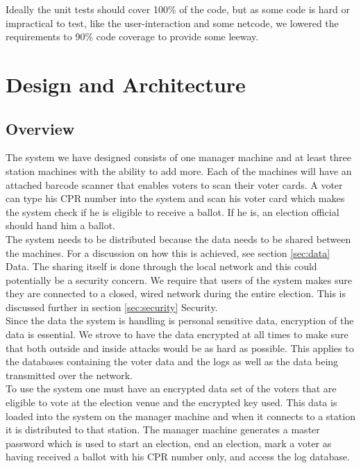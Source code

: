 \documentclass[a4paper]{report}
\begin{document}
Ideally the unit tests should cover 100\% of the code, but as some code is hard or impractical to test, like the user-interaction and some netcode, we lowered the requirements to 90\% code coverage to provide some leeway. 

\chapter{Design and Architecture}
\section{Overview}
The system we have designed consists of one manager machine and at least three station machines with the ability to add more. Each of the machines will have an attached barcode scanner that enables voters to scan their voter cards. A voter can type his CPR number into the system and scan his voter card which makes the system check if he is eligible to receive a ballot. If he is, an election official should hand him a ballot. \\

The system needs to be distributed because the data needs to be shared between the machines. For a discussion on how this is achieved, see section \ref{sec:data} Data. The sharing itself is done through the local network and this could potentially be a security concern. We require that users of the system makes sure they are connected to a closed, wired network during the entire election. This is discussed further in section \ref{sec:security} Security.\\

Since the data the system is handling is personal sensitive data, encryption of the data is essential. We strove to have the data encrypted at all times to make sure that both outside and inside attacks would be as hard as possible. This applies to the databases containing the voter data and the logs as well as the data being transmitted over the network. \\

To use the system one must have an encrypted data set of the voters that are eligible to vote at the election venue and the encrypted key used. This data is loaded into the system on the manager machine and when it connects to a station it is distributed to that station. The manager machine generates a master password which is used to start an election, end an election, mark a voter as having received a ballot with his CPR number only, and access the log database.\\
\end{document}
